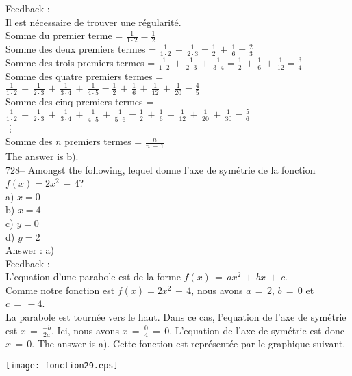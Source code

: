 \documentclass[letterpaper, 12pt]{article}
\begin{document}
Feedback : \\
Il est n\'ecessaire de trouver une r\'egularit\'e. \\
Somme du premier terme = $\frac{1}{1\cdot2}=\frac{1}{2}$\\[2mm]
Somme des deux premiers termes =
$\frac{1}{1\cdot2}\,+\,\frac{1}{2\cdot3}=\frac{1}{2}\,+\,\frac{1}{6}=\frac{2}{3}$\\[2mm]
Somme des trois premiers termes =
$\frac{1}{1\cdot2}\,+\,\frac{1}{2\cdot3}\,+\,\frac{1}{3\cdot4}=\frac{1}{2}\,+\,\frac{1}{6}\,+\,\frac{1}{12}=\frac{3}{4}$\\[2mm]
Somme des quatre premiers termes =
$\frac{1}{1\cdot2}\,+\,\frac{1}{2\cdot3}\,+\,\frac{1}{3\cdot4}\,+\,\frac{1}{4\cdot5}=\frac{1}{2}\,+\,\frac{1}{6}\,+\,\frac{1}{12}\,+\,\frac{1}{20}=\frac{4}{5}$\\[2mm]
Somme des cinq premiers termes =
$\frac{1}{1\cdot2}\,+\,\frac{1}{2\cdot3}\,+\,\frac{1}{3\cdot4}\,+\,\frac{1}{4\cdot5}\,+\,\frac{1}{5\cdot6}=\frac{1}{2}\,+\,\frac{1}{6}\,+\,\frac{1}{12}\,+\,\frac{1}{20}\,+\,\frac{1}{30}=\frac{5}{6}$\\
\vdots\\
Somme des $n$ premiers termes = $\frac{n}{n\,+\,1}$\\[2mm]
The answer is b).\\

728-- Amongst the following, lequel donne l'axe de sym\'etrie de
la fonction $f(x)= 2x^{2}\,-\,4$?\\
a) $x=0$\\
b) $x=4$\\
c) $y=0$\\
d) $y=2$\\

Answer : a)\\

Feedback : \\
L'equation d'une parabole est de la forme
$f(x)\,=\,ax^2\,+\,bx\,+\,c$.\\
Comme notre fonction est $f(x)= 2x^{2}\,-\,4$, nous avons $a\,=\,2$,
$b\,=\,0$ et $c\,=\,-4$.\\
La parabole est tourn\'ee vers le haut. Dans ce cas, l'equation de
l'axe de sym\'etrie est $x\,=\, \frac{-b}{2a}$. Ici, nous avons
$x\,=\,\frac{0}{4}\,=\,0$. L'equation de l'axe de sym\'etrie est
donc $x\,=\,0$. The answer is a).
Cette fonction est repr\'esent\'ee par le graphique suivant.\\
    \begin{center}
    \texttt{[image: fonction29.eps]}
    \end{center}
\end{document}
